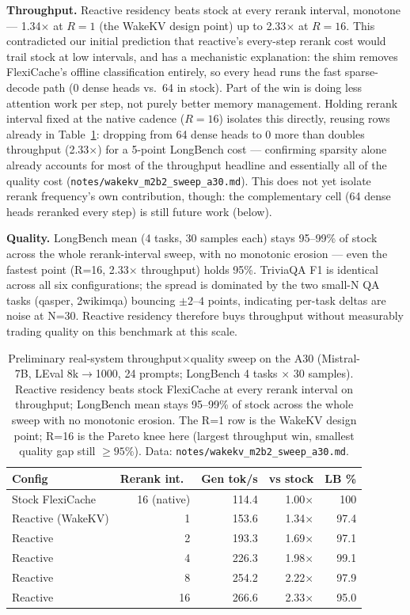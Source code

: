 \documentclass[11pt]{article}
\begin{document}
\textbf{Throughput.} Reactive residency beats stock at every rerank
interval, monotone --- 1.34$\times$ at $R{=}1$ (the WakeKV design
point) up to 2.33$\times$ at $R{=}16$. This contradicted our initial
prediction that reactive's every-step rerank cost would trail stock at
low intervals, and has a mechanistic explanation: the shim removes
FlexiCache's offline classification entirely, so every head runs the
fast sparse-decode path (0 dense heads vs.\ 64 in stock). Part of the
win is doing less attention work per step, not purely better memory
management. Holding rerank interval fixed at the native cadence
($R{=}16$) isolates this directly, reusing rows already in
Table~\ref{tab:m2b2}: dropping from 64 dense heads to 0 more than
doubles throughput (2.33$\times$) for a 5-point LongBench cost ---
confirming sparsity alone already accounts for most of the throughput
headline and essentially all of the quality cost
(\texttt{notes/wakekv\_m2b2\_sweep\_a30.md}). This does not yet isolate
rerank frequency's own contribution, though: the complementary cell
(64 dense heads reranked every step) is still future work (below).

\textbf{Quality.} LongBench mean (4 tasks, 30 samples each) stays
95--99\% of stock across the whole rerank-interval sweep, with no
monotonic erosion --- even the fastest point (R=16, 2.33$\times$
throughput) holds 95\%. TriviaQA F1 is identical across all six
configurations; the spread is dominated by the two small-N QA tasks
(qasper, 2wikimqa) bouncing $\pm 2$--$4$ points, indicating per-task
deltas are noise at N=30. Reactive residency therefore buys throughput
without measurably trading quality on this benchmark at this scale.

\begin{table}[t]
\centering
\small
\begin{tabular}{lrrrr}
\toprule
Config & Rerank int.\ & Gen tok/s & vs stock & LB \% \\
\midrule
Stock FlexiCache & 16 (native) & 114.4 & 1.00$\times$ & 100 \\
Reactive (WakeKV) & 1 & 153.6 & 1.34$\times$ & 97.4 \\
Reactive & 2 & 193.3 & 1.69$\times$ & 97.1 \\
Reactive & 4 & 226.3 & 1.98$\times$ & 99.1 \\
Reactive & 8 & 254.2 & 2.22$\times$ & 97.9 \\
Reactive & 16 & 266.6 & 2.33$\times$ & 95.0 \\
\bottomrule
\end{tabular}
\caption{Preliminary real-system throughput$\times$quality sweep on
the A30 (Mistral-7B, LEval 8k$\to$1000, 24 prompts; LongBench 4
tasks $\times$ 30 samples). Reactive residency beats stock
FlexiCache at every rerank interval on throughput; LongBench mean
stays 95--99\% of stock across the whole sweep with no monotonic
erosion. The R=1 row is the WakeKV design point; R=16 is the
Pareto knee here (largest throughput win, smallest quality gap
still $\geq 95\%$). Data:
\texttt{notes/wakekv\_m2b2\_sweep\_a30.md}.}
\label{tab:m2b2}
\end{table}
\end{document}
